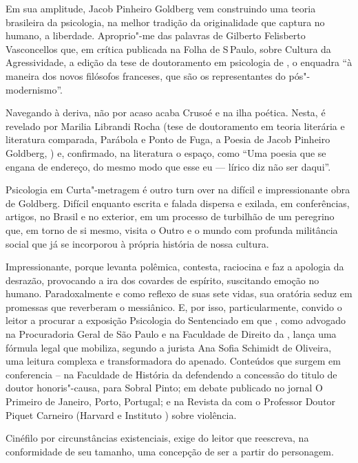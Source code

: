  

Em sua amplitude, Jacob Pinheiro Goldberg vem construindo uma teoria
brasileira da psicologia, na melhor tradição da originalidade que
captura no humano, a liberdade. Aproprio"-me das palavras de Gilberto
Felisberto Vasconcellos que, em crítica publicada na Folha de S\,Paulo,
sobre Cultura da Agressividade, a edição da tese de doutoramento em
psicologia de , o enquadra ``à maneira dos novos filósofos franceses,
que são os representantes do pós"-modernismo''.

Navegando à deriva, não por acaso acaba Crusoé e na ilha poética. Nesta,
é revelado por Marilia Librandi Rocha (tese de doutoramento em teoria
literária e literatura comparada, Parábola e Ponto de Fuga, a Poesia de
Jacob Pinheiro Goldberg, ) e, confirmado, na literatura o espaço,
como ``Uma poesia que se engana de endereço, do mesmo modo que esse eu
--- lírico diz não ser daqui''.

Psicologia em Curta"-metragem é outro turn over na difícil e
impressionante obra de Goldberg. Difícil enquanto escrita e falada
dispersa e exilada, em conferências, artigos, no Brasil e no exterior,
em um processo de turbilhão de um peregrino que, em torno de si mesmo,
visita o Outro e o mundo com profunda militância social que já se
incorporou à própria história de nossa cultura.

Impressionante, porque levanta polêmica, contesta, raciocina e faz a
apologia da desrazão, provocando a ira dos covardes de espírito,
suscitando emoção no humano. Paradoxalmente e como reflexo de suas sete
vidas, sua oratória seduz em promessas que reverberam o messiânico. E,
por isso, particularmente, convido o leitor a procurar a exposição
Psicologia do Sentenciado em que , como advogado na Procuradoria
Geral de São Paulo e na Faculdade de Direito da , lança uma fórmula
legal que mobiliza, segundo a jurista Ana Sofia Schimidt de Oliveira,
uma leitura complexa e transformadora do apenado. Conteúdos que surgem
em conferencia -- na Faculdade de História da  defendendo a concessão
do titulo de doutor honoris"-causa, para Sobral Pinto; em debate
publicado no jornal O Primeiro de Janeiro, Porto, Portugal; e na Revista
da  com o Professor Doutor Piquet Carneiro (Harvard e Instituto
) sobre violência.

Cinéfilo por circunstâncias existenciais, exige do leitor que reescreva,
na conformidade de seu tamanho, uma concepção de ser a partir do
personagem.


